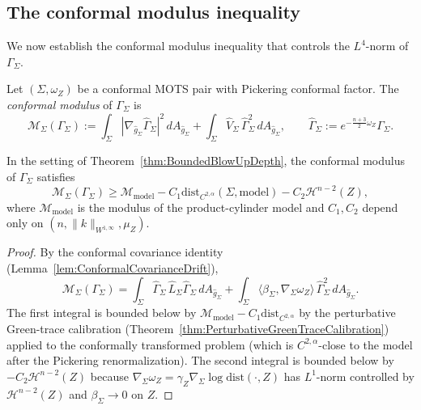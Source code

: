 \subsection{The conformal modulus inequality}

We now establish the conformal modulus inequality that controls the $L^4$-norm of $\Gamma_\Sigma$.

\begin{definition}\label{def:ConformalModulus}
Let $(\Sigma,\omega_Z)$ be a conformal MOTS pair with Pickering conformal factor. The \emph{conformal modulus} of $\Gamma_\Sigma$ is
\begin{equation}\label{eq:ConformalModulusDef}
    \mathcal M_\Sigma(\Gamma_\Sigma)
    :=
    \int_\Sigma|\nabla_{\hat g_\Sigma}\widehat\Gamma_\Sigma|^2\,dA_{\hat g_\Sigma}
    +\int_\Sigma\widehat V_\Sigma\,\widehat\Gamma_\Sigma^2\,dA_{\hat g_\Sigma},
    \qquad
    \widehat\Gamma_\Sigma:=e^{-\frac{n+3}{2}\omega_Z}\Gamma_\Sigma.
\end{equation}
\end{definition}

\begin{theorem}\label{thm:ConformalModulusInequality}
In the setting of Theorem~\ref{thm:BoundedBlowUpDepth}, the conformal modulus of $\Gamma_\Sigma$ satisfies
\begin{equation}\label{eq:ConformalModulusBound}
    \mathcal M_\Sigma(\Gamma_\Sigma)
    \ge
    \mathcal M_{\mathrm{model}}-C_1\mathrm{dist}_{C^{2,\alpha}}(\Sigma,\mathrm{model})-C_2\mathcal H^{n-2}(Z),
\end{equation}
where $\mathcal M_{\mathrm{model}}$ is the modulus of the product-cylinder model and $C_1,C_2$ depend only on $(n,\|k\|_{W^{1,\infty}},\mu_Z)$.
\end{theorem}

\begin{proof}
By the conformal covariance identity (Lemma~\ref{lem:ConformalCovarianceDrift}),
\[
    \mathcal M_\Sigma(\Gamma_\Sigma)
    =
    \int_\Sigma\widehat\Gamma_\Sigma\,\widehat L_\Sigma\widehat\Gamma_\Sigma\,dA_{\hat g_\Sigma}
    +\int_\Sigma\langle\beta_\Sigma,\nabla_\Sigma\omega_Z\rangle\,\widehat\Gamma_\Sigma^2\,dA_{\hat g_\Sigma}.
\]
The first integral is bounded below by $\mathcal M_{\mathrm{model}}-C_1\mathrm{dist}_{C^{2,\alpha}}$ by the perturbative Green-trace calibration (Theorem~\ref{thm:PerturbativeGreenTraceCalibration}) applied to the conformally transformed problem (which is $C^{2,\alpha}$-close to the model after the Pickering renormalization). The second integral is bounded below by $-C_2\mathcal H^{n-2}(Z)$ because $\nabla_\Sigma\omega_Z=\gamma_Z\nabla_\Sigma\log\mathrm{dist}(\cdot,Z)$ has $L^1$-norm controlled by $\mathcal H^{n-2}(Z)$ and $\beta_\Sigma\to 0$ on $Z$.
\end{proof}

